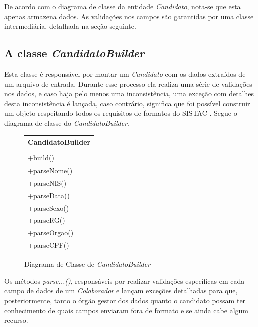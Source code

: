 \documentclass[
	12pt,			%
	openright,		%
	oneside,	
	a4paper,		%
	english,		%
	brazil			%
]{abntex2/abntex2}  %
\begin{document}
				De acordo com o diagrama de classe da entidade \textit{Candidato}, nota-se que esta apenas armazena dados. As validações nos campos são garantidas por uma classe intermediária, detalhada na seção seguinte.
	
			\subsection{A classe \textit{CandidatoBuilder}} \label{candidato-builder}
				
				Esta classe é responsável por montar um \textit{Candidato} com os dados extraídos de um arquivo de entrada. Durante esse processo ela realiza uma série de validações nos dados, e caso haja pelo menos uma inconsistência, uma exceção com detalhes desta inconsistência é lançada, caso contrário, significa que foi possível construir um objeto respeitando todos os requisitos de formatos do SISTAC \cite{sistac-formatos}. Segue o diagrama de classe do \textit{CandidatoBuilder}.
				
				\begin{figure}[ht]
					\begin{center}
						
						\caption{Diagrama de Classe de \textit{CandidatoBuilder}}
						\label{candidatobuilder-uml}
						
						\begin{tabular}{|l|}
							\hline
							\multicolumn{1}{|c|}{\textbf{CandidatoBuilder}} \\ \hline
							\\ \hline
							+build() \\
							+parseNome() \\
							+parseNIS() \\
							+parseData() \\
							+parseSexo() \\
							+parseRG() \\
							+parseOrgao() \\
							+parseCPF() \\ \hline
						\end{tabular}
					
					\end{center}
				\end{figure}
	
				Os métodos \textit{parse...()}, responsáveis por realizar validações específicas em cada campo de dados de um \textit{Colaborador} e lançam exceções detalhadas para que, posteriormente, tanto o órgão gestor dos dados quanto o candidato possam ter conhecimento de quais campos enviaram fora de formato e se ainda cabe algum recurso.
				
\end{document}

